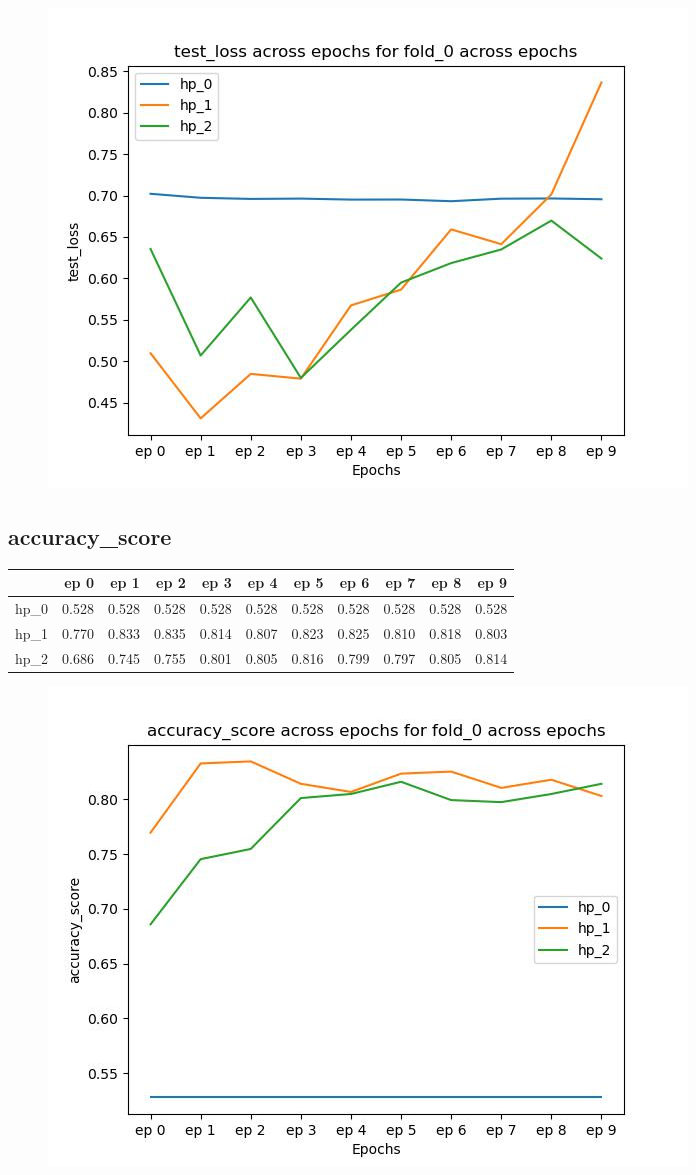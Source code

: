 \documentclass{article}
\begin{document}
\begin{figure}[H]
\includegraphics[scale = 0.75]{fold_0/test_loss}
\end{figure}
\subsection{accuracy\_score}
\begin{tabular}{lrrrrrrrrrr}
\toprule
{} &   ep 0 &   ep 1 &   ep 2 &   ep 3 &   ep 4 &   ep 5 &   ep 6 &   ep 7 &   ep 8 &   ep 9 \\
\midrule
hp\_0 &  0.528 &  0.528 &  0.528 &  0.528 &  0.528 &  0.528 &  0.528 &  0.528 &  0.528 &  0.528 \\
hp\_1 &  0.770 &  0.833 &  0.835 &  0.814 &  0.807 &  0.823 &  0.825 &  0.810 &  0.818 &  0.803 \\
hp\_2 &  0.686 &  0.745 &  0.755 &  0.801 &  0.805 &  0.816 &  0.799 &  0.797 &  0.805 &  0.814 \\
\bottomrule
\end{tabular}

\begin{figure}[H]
\includegraphics[scale = 0.75]{fold_0/accuracy_score}
\end{figure}
\end{document}
